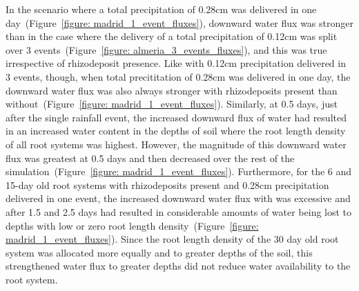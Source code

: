 \documentclass[11pt,a4paper]{article}
\numberwithin{equation}{section}
\begin{document}
In the scenario where a total precipitation of 0.28cm was delivered in one day~(Figure~\ref{figure: madrid_1_event_fluxes}), downward water flux was stronger than in the case where the delivery of a total precipitation of 0.12cm was split over 3 events~(Figure~\ref{figure: almeria_3_events_fluxes}), and this was true irrespective of rhizodeposit presence. Like with 0.12cm precipitation delivered in 3 events, though, when total precititation of 0.28cm was delivered in one day, the downward water flux was also always stronger with rhizodeposits present than without~(Figure~\ref{figure: madrid_1_event_fluxes}). Similarly, at 0.5 days, just after the single rainfall event, the increased downward flux of water had resulted in an increased water content in the depths of soil where the root length density of all root systems was highest. However, the magnitude of this downward water flux was greatest at 0.5 days and then decreased over the rest of the simulation~(Figure~\ref{figure: madrid_1_event_fluxes}). Furthermore, for the 6 and 15-day old root systems with rhizodeposits present and 0.28cm precipitation delivered in one event, the increased downward water flux with was excessive and after 1.5 and 2.5 days had resulted in considerable amounts of water being lost to depths with low or zero root length density~(Figure~\ref{figure: madrid_1_event_fluxes}). Since the root length density of the 30 day old root system was allocated more equally and to greater depths of the soil, this strengthened water flux to greater depths did not reduce water availability to the root system.    
  
\end{document}
